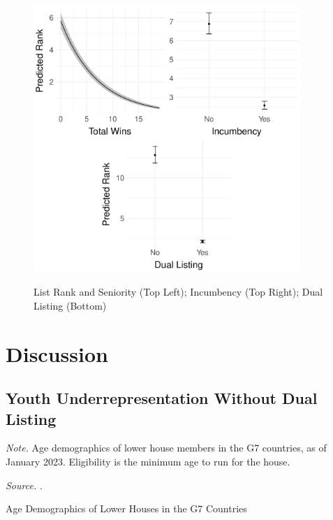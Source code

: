 \documentclass[a4paper, 11pt]{article}
\begin{document}
\begin{figure}[!thb]
	\caption{List Rank and Seniority (Top Left); Incumbency (Top Right); Dual Listing (Bottom)}
	\includegraphics[width = 0.9\textwidth]{../figure/paper/h1_h2_h3.pdf}
	\label{fig:rank}
\end{figure}



\section{Discussion} \label{sec: dis}


\subsection{Youth Underrepresentation Without Dual Listing}


\begin{table}[htbp]
\begin{center}
\begin{threeparttable}

\begin{tablenotes}[flushleft]
  \scriptsize{
    \item{\textit{Note.} Age demographics of lower house members in the G7 countries, as of January 2023. Eligibility is the minimum age to run for the house.}
    \item{\textit{Source.} \citet{ipu2023}.}
  }
\end{tablenotes}
\end{threeparttable}
\caption{Age Demographics of Lower Houses in the G7 Countries}
\label{table:intl}
\end{center}
\end{table}
\end{document}
